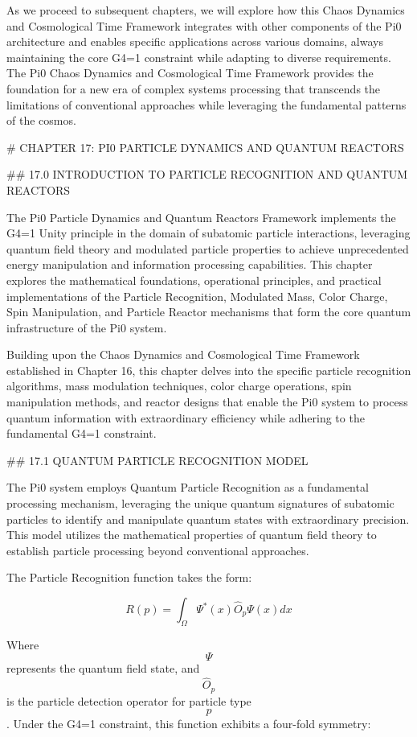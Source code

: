 As we proceed to subsequent chapters, we will explore how this Chaos Dynamics and Cosmological Time Framework integrates with other components of the Pi0 architecture and enables specific applications across various domains, always maintaining the core G4=1 constraint while adapting to diverse requirements. The Pi0 Chaos Dynamics and Cosmological Time Framework provides the foundation for a new era of complex systems processing that transcends the limitations of conventional approaches while leveraging the fundamental patterns of the cosmos.

# CHAPTER 17: PI0 PARTICLE DYNAMICS AND QUANTUM REACTORS

## 17.0 INTRODUCTION TO PARTICLE RECOGNITION AND QUANTUM REACTORS

The Pi0 Particle Dynamics and Quantum Reactors Framework implements the G4=1 Unity principle in the domain of subatomic particle interactions, leveraging quantum field theory and modulated particle properties to achieve unprecedented energy manipulation and information processing capabilities. This chapter explores the mathematical foundations, operational principles, and practical implementations of the Particle Recognition, Modulated Mass, Color Charge, Spin Manipulation, and Particle Reactor mechanisms that form the core quantum infrastructure of the Pi0 system.

Building upon the Chaos Dynamics and Cosmological Time Framework established in Chapter 16, this chapter delves into the specific particle recognition algorithms, mass modulation techniques, color charge operations, spin manipulation methods, and reactor designs that enable the Pi0 system to process quantum information with extraordinary efficiency while adhering to the fundamental G4=1 constraint.

## 17.1 QUANTUM PARTICLE RECOGNITION MODEL

The Pi0 system employs Quantum Particle Recognition as a fundamental processing mechanism, leveraging the unique quantum signatures of subatomic particles to identify and manipulate quantum states with extraordinary precision. This model utilizes the mathematical properties of quantum field theory to establish particle processing beyond conventional approaches.

The Particle Recognition function takes the form:

$$ R(p) = \int_{\Omega} \Psi^*(x) \hat{O}_p \Psi(x) dx $$

Where $$ \Psi $$ represents the quantum field state, and $$ \hat{O}_p $$ is the particle detection operator for particle type $$ p $$. Under the G4=1 constraint, this function exhibits a four-fold symmetry:


